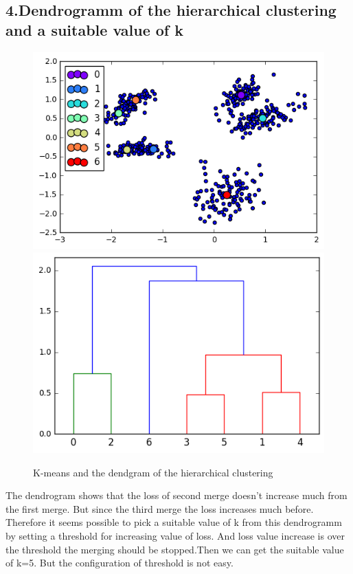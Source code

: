 \documentclass[a4paper,11pt]{article}
\begin{document}
\begin{verbatim}


\end{verbatim}

\subsection*{4.Dendrogramm of the hierarchical clustering and a suitable value of k}

\begin{figure}[htbp]
  \includegraphics[scale=0.5]{kmfordend.png}
  \includegraphics[scale=0.5]{dendg.png}
  \caption{K-means and the dendgram of the hierarchical clustering}
\end{figure}

The dendrogram shows that the loss of second merge doesn't increase much from the first merge.    But since the third merge the loss increases much before. Therefore it seems possible to pick a suitable value of k from this dendrogramm by setting a threshold for increasing value of loss. And loss value increase is over the threshold the merging should be stopped.Then we can get the suitable value of k=5. But the configuration of threshold is not easy.
\end{document}
